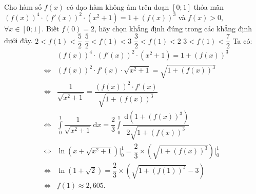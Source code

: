 \begin{ex}%
	Cho hàm số $f(x)$ có đạo hàm không âm trên đoạn $[0;1]$ thỏa mãn $\left(f(x)\right)^4\cdot\left(f'(x)\right)^2\cdot(x^2+1)=1+\left(f(x)\right)^3$ và $f(x)>0$, $\forall x \in [0;1]$. Biết $f(0)=2$, hãy chọn khẳng định đúng trong các khẳng định dưới đây.
	\choice
	{$2<f(1)<\dfrac{5}{2}$}
	{\True $\dfrac{5}{2}<f(1)<3$}
	{$\dfrac{3}{2}<f(1)<2$}
	{$3<f(1)<\dfrac{7}{2}$}
	\loigiai
	{Ta có:
			\begin{eqnarray*}
	 & & \left(f(x)\right)^4\cdot\left(f'(x)\right)^2\cdot(x^2+1)=1+\left(f(x)\right)^3\\
		&\Leftrightarrow& \left(f(x)\right)^2\cdot f'(x)\cdot\sqrt{x^2+1}=\sqrt{1+\left(f(x)\right)^3}\\
		&\Leftrightarrow& \dfrac{1}{\sqrt{x^2+1}}=\dfrac{\left(f(x)\right)^2\cdot f'(x)}{\sqrt{1+\left(f(x)\right)^3}}\\
		&\Leftrightarrow&\displaystyle\int\limits_0^1 \dfrac{1}{\sqrt{x^2+1}} \mathrm{\,d}x=\dfrac{2}{3}\displaystyle\int\limits_0^1\dfrac{\mathrm{\,d}\left(1+\left(f(x)\right)^3\right)}{2\sqrt{1+\left(f(x)\right)^3}}\\
		&\Leftrightarrow&\ln\left(x+\sqrt{x^2+1}\right)\bigg|_0^1=\dfrac{2}{3}\times\left(\sqrt{1+\left(f(x)\right)^3}\right)\bigg|_0^1\\
		&\Leftrightarrow& \ln\left(1+\sqrt{2}\right)=\dfrac{2}{3}\times\left(\sqrt{1+\left(f(1)\right)^3}-3\right)\\
		&\Leftrightarrow& f(1)\approx 2{,}605.
		\end{eqnarray*}
	}
\end{ex}



